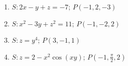 \documentclass[12pt]{article}
\newif\ifans
\begin{document}
\begin{enumerate}

\item $S: 2x-y+z=-7$; $P(-1,2,-3)$

\ifans{\fbox{$\overrightarrow{n_{1,2}}=\pm \left\langle \frac{2}{\sqrt{6}},-\frac{1}{\sqrt{6}},\frac{1}{\sqrt{6}} \right\rangle$}} \fi

\item $S: x^2-3y+z^2=11$; $P(-1,-2,2)$

\ifans{\fbox{$\overrightarrow{n_{1,2}}=\pm \left\langle -\frac{2}{\sqrt{29}},-\frac{3}{\sqrt{29}},\frac{4}{\sqrt{29}} \right\rangle$}} \fi

\item $S: z=y^4$; $P(3,-1,1)$

\ifans{\fbox{$\overrightarrow{n_{1,2}}=\pm \left\langle 0,-\frac{4}{\sqrt{17}},-\frac{1}{\sqrt{17}} \right\rangle$}} \fi

\item $S: z=2-x^2\cos{(xy)}$; $P\left(-1,\frac{\pi}{2},2\right)$

\ifans{\fbox{$\overrightarrow{n_{1,2}}=\pm \frac{2}{\sqrt{\pi^2+8}}\left\langle -\frac{\pi}{2},1,-1 \right\rangle$}} \fi

\end{enumerate}

\end{document}
